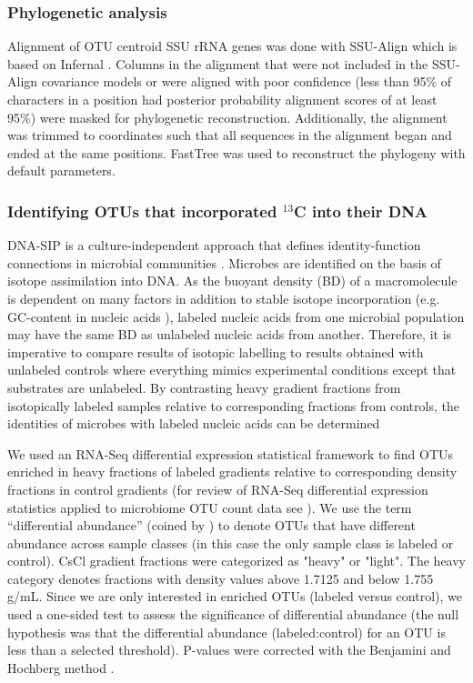 \documentclass{article}
\begin{document}
\subsubsection{Phylogenetic analysis}
Alignment of OTU centroid SSU rRNA genes was done with SSU-Align which is based on Infernal
\citep{Nawrocki_2013,Nawrocki_2009}. Columns in the alignment that were not included in
the SSU-Align covariance models or were aligned with poor confidence (less than
95\% of characters in a position had posterior probability alignment scores of
at least 95\%) were masked for phylogenetic reconstruction. Additionally, the
alignment was trimmed to coordinates such that all sequences in the alignment
began and ended at the same positions. FastTree \citep{Price_2009} was used to
reconstruct the phylogeny with default parameters.

\subsubsection{Identifying OTUs that incorporated $^{13}$C into their DNA}\label{fc}
DNA-SIP is a culture-independent approach that defines identity-function
connections in microbial communities
\citep{Buckley_2011,Neufeld_2007,Radajewski_2003}. Microbes are identified on
the basis of isotope assimilation into DNA. As the buoyant density (BD) of
a macromolecule is dependent on many factors in addition to stable isotope
incorporation (e.g. GC-content in nucleic acids \citep{Youngblut_2014}),
labeled nucleic acids from one microbial population may have the same BD as
unlabeled nucleic acids from another. Therefore, it is imperative to compare
results of isotopic labelling to results obtained with unlabeled controls where
everything mimics experimental conditions except that substrates are unlabeled.
By contrasting heavy gradient fractions from isotopically labeled samples
relative to corresponding fractions from controls, the identities of microbes
with labeled nucleic acids can be determined 

We used an RNA-Seq differential expression statistical framework
\citep{Love_2014} to find OTUs enriched in heavy fractions of labeled
gradients relative to corresponding density fractions in control gradients
(for review of RNA-Seq differential expression statistics applied to
microbiome OTU count data see \citep{McMurdie_2014}). We use the term
“differential abundance” (coined by \citep{McMurdie_2014}) to denote OTUs that
have different abundance across sample classes (in this case the only sample
class is labeled or control). CsCl gradient fractions were categorized as
"heavy" or "light". The heavy category denotes fractions with density values
above 1.7125 and below 1.755 g/mL. Since we are only interested in enriched
OTUs (labeled versus control), we used a one-sided test to assess the
significance of differential abundance (the null hypothesis was that the
differential abundance (labeled:control) for an OTU is less than a selected
threshold). P-values were corrected with the Benjamini and Hochberg method
\citep{Benjamini_1997}. 
\end{document}
